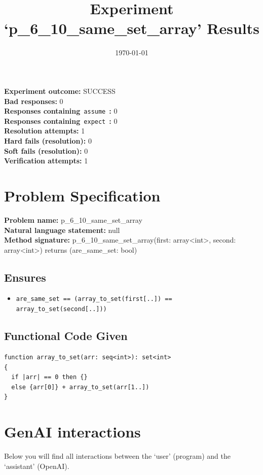 \documentclass{article}
\begin{document}
\title{Experiment `p\_6\_10\_same\_set\_array' Results}
\author{\today}
\date{}
\maketitle
\textbf{Experiment outcome: }SUCCESS
\\\textbf{Bad responses: }0
\\\textbf{Responses containing}~\texttt{assume}~\textbf{: }0
\\\textbf{Responses containing}~\texttt{expect}~\textbf{: }0
\\\textbf{Resolution attempts: }1
\\\textbf{Hard fails (resolution): }0
\\\textbf{Soft fails (resolution): }0
\\\textbf{Verification attempts: }1
\section*{Problem Specification}
\textbf{Problem name: }p\_6\_10\_same\_set\_array
\\\textbf{Natural language statement: }null
\\\textbf{Method signature: }p\_6\_10\_same\_set\_array(first: array<int>, second: array<int>) returns (are\_same\_set: bool)
\subsection*{Ensures}
\begin{itemize}
\item \texttt{are\_same\_set == (array\_to\_set(first[..]) == array\_to\_set(second[..]))}
\end{itemize}
\subsection*{Functional Code Given}
\begin{lstlisting}
function array_to_set(arr: seq<int>): set<int>
{
  if |arr| == 0 then {}
  else {arr[0]} + array_to_set(arr[1..])
}
\end{lstlisting}
\clearpage
\section*{GenAI interactions}
Below you will find all interactions between the `user' (program) and the `assistant' (OpenAI).
\end{document}
